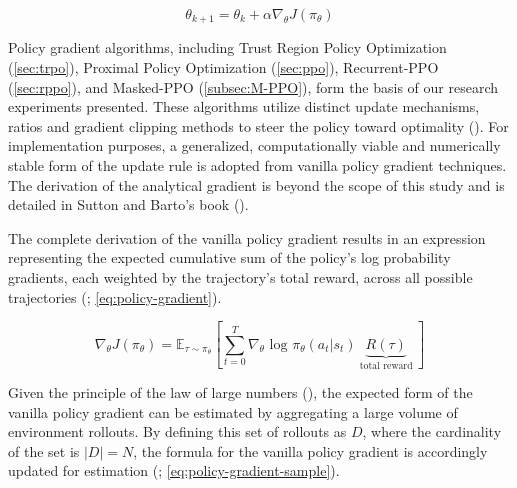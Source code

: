         \begin{equation}
            \theta_{k+1} = \theta_k + \alpha \nabla_{\theta} J(\pi_{\theta})
            \label{eq:param-update}
        \end{equation}
        
        \noindent Policy gradient algorithms, including Trust Region Policy Optimization (\autoref{sec:trpo}), Proximal Policy Optimization (\autoref{sec:ppo}), Recurrent-PPO (\autoref{sec:rppo}), and Masked-PPO (\autoref{subsec:M-PPO}), form the basis of our research experiments presented. These algorithms utilize distinct update mechanisms, ratios and gradient clipping methods to steer the policy toward optimality (\textcolor{deepblue}{\cite{lehmann2024definitive}}). For implementation purposes, a generalized, computationally viable and numerically stable form of the update rule is adopted from vanilla policy gradient techniques. The derivation of the analytical gradient is beyond the scope of this study and is detailed in Sutton and Barto's book (\textcolor{deepblue}{\cite{Sutton1998}}).
        
        \bigskip
        
        \noindent The complete derivation of the vanilla policy gradient results in an expression representing the expected cumulative sum of the policy's log probability gradients, each weighted by the trajectory's total reward, across all possible trajectories (\textcolor{deepblue}{\cite{SpinningUp2018}; \autoref{eq:policy-gradient}}).
        
        \begin{equation}
            \nabla_{\theta}J(\pi_{\theta}) = \mathbb{E}_{\tau \sim \pi_{\theta}} \left[ \sum_{t=0}^{T} \nabla_{\theta} \text{ log } \pi_{\theta}(a_t | s_t) \underbrace{R(\tau)}_{\text{ total reward }}\right]
            \label{eq:policy-gradient}
        \end{equation}
        
        
        
        \noindent Given the principle of the law of large numbers (\textcolor{deepblue}{\cite{Athreya2006}}), the expected form of the vanilla policy gradient can be estimated by aggregating a large volume of environment rollouts. By defining this set of rollouts as $D$, where the cardinality of the set is $|D| = N$, the formula for the vanilla policy gradient is accordingly updated for estimation (\textcolor{deepblue}{\cite{SpinningUp2018}; \autoref{eq:policy-gradient-sample}}).
        
